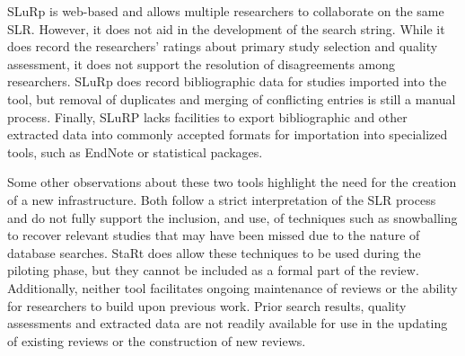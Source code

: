 SLuRp is web-based and allows multiple researchers to collaborate on the same SLR. However, it does not aid in the development of the search string.  While it does record the researchers' ratings about primary study selection and quality assessment, it does not support the resolution of disagreements among researchers. SLuRp does record bibliographic data for studies imported into the tool, but removal of duplicates and merging of conflicting entries is still a manual process. Finally, SLuRP lacks facilities to export bibliographic and other extracted data into commonly accepted formats for importation into specialized tools, such as EndNote or statistical packages.

Some other observations about these two tools highlight the need for the creation of a new infrastructure. Both follow a strict interpretation of the SLR process and do not fully support the inclusion, and use, of techniques such as snowballing to recover relevant studies that may have been missed due to the nature of database searches. StaRt does allow these techniques to be used during the piloting phase, but they cannot be included as a formal part of the review. Additionally, neither tool facilitates ongoing maintenance of reviews or the ability for researchers to build upon previous work. Prior search results, quality assessments and extracted data are not readily available for use in the updating of existing reviews or the construction of new reviews. 


